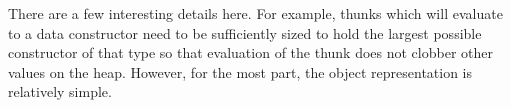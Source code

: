 \documentclass[9pt]{extarticle}
\begin{document}
There are a few interesting details here. For example, thunks which will
evaluate to a data constructor need to be sufficiently sized to hold the
largest possible constructor of that type so that evaluation of the
thunk does not clobber other values on the heap. However, for the most
part, the object representation is relatively simple.
\end{document}
